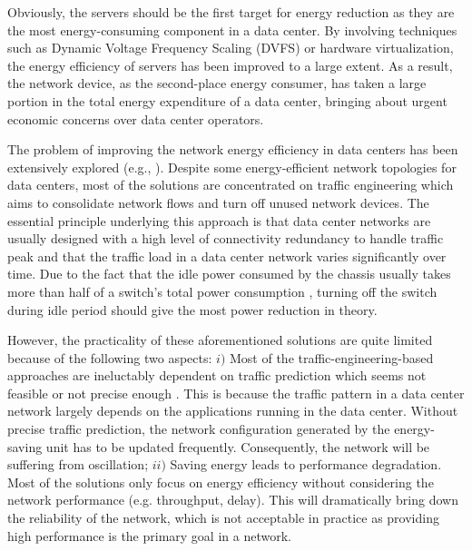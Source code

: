 \documentclass[10pt, conference, compsocconf]{IEEEtran}
\begin{document}
Obviously, the servers should be the first target for energy reduction as they are the most energy-consuming component in a data center.   
By involving techniques such as Dynamic Voltage Frequency Scaling (DVFS) or hardware virtualization, the energy efficiency of servers has been improved to a large extent. As a result, the network device, as the second-place energy consumer, has taken a large portion in the total energy expenditure of a data center, bringing about urgent economic concerns over data center operators.



The problem of improving the network energy efficiency in data centers has been extensively explored (e.g., \cite{Heller_Seetharaman, Shang_Li, Wang_Yao,  Vasic_Bhurat-2011, Wang_Zhang-JSAC-2013}). Despite some energy-efficient network topologies for data centers, most of the solutions are concentrated on traffic engineering which aims to consolidate network flows and turn off unused network devices. The essential principle underlying this approach is that data center networks are usually designed with a high level of connectivity redundancy to handle traffic peak and that the traffic load in a data center network varies significantly over time. Due to the fact that the idle power consumed by the chassis usually takes more than half of a switch's total power consumption \cite{Mahadevan_Sharma}, turning off the switch during idle period should give the most power reduction in theory.

However, the practicality of these aforementioned solutions are quite limited because of the following two aspects: $\mathit{i})$ Most of the traffic-engineering-based approaches are ineluctably dependent on traffic prediction which seems not feasible or not precise enough \cite{Benson_Anand}. This is because the traffic pattern in a data center network largely depends on the applications running in the data center. Without precise traffic prediction, the network configuration generated by the energy-saving unit has to be updated frequently. Consequently, the network will be suffering from oscillation; $\mathit{ii})$ Saving energy leads to performance degradation. Most of the solutions only focus on energy efficiency without considering the network performance (e.g. throughput, delay). This will dramatically bring down the reliability of the network, which is not acceptable in practice as providing high performance is the primary goal in a network.
\end{document}
